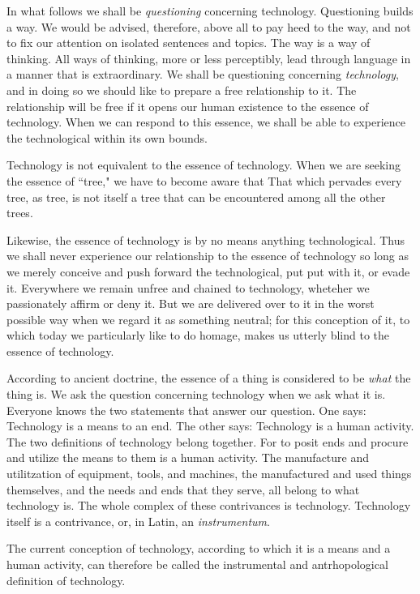 In what follows we shall be \textit{questioning} concerning technology. Questioning builds a way. We would be advised, therefore, above all to pay heed to the way, and not to fix our attention on isolated sentences and topics. The way is a way of thinking. All ways of thinking, more or less perceptibly, lead through language in a manner that is extraordinary. We shall be questioning concerning \textit{technology}, and in doing so we should like to prepare a free relationship to it. The relationship will be free if it opens our human existence to the essence of technology. When we can respond to this essence, we shall be able to experience the technological within its own bounds.

Technology is not equivalent to the essence of technology. When we are seeking the essence of ``tree," we have to become aware that That which pervades every tree, as tree, is not itself a tree that can be encountered among all the other trees.

Likewise, the essence of technology is by no means anything technological. Thus we shall never experience our relationship to the essence of technology so long as we merely conceive and push forward the technological, put put with it, or evade it. Everywhere we remain unfree and chained to technology, wheteher we passionately affirm or deny it. But we are delivered over to it in the worst possible way when we regard it as something neutral; for this conception of it, to which today we particularly like to do homage, makes us utterly blind to the essence of technology.

According to ancient doctrine, the essence of a thing is considered to be \textit{what} the thing is. We ask the question concerning technology when we ask what it is. Everyone knows the two statements that answer our question. One says: Technology is a means to an end. The other says: Technology is a human activity. The two definitions of technology belong together. For to posit ends and procure and utilize the means to them is a human activity. The manufacture and utilitzation of equipment, tools, and machines, the manufactured and used things themselves, and the needs and ends that they serve, all belong to what technology is. The whole complex of these contrivances is technology. Technology itself is a contrivance, or, in Latin, an \textit{instrumentum}.

The current conception of technology, according to which it is a means and a human activity, can therefore be called the instrumental and antrhopological definition of technology.

